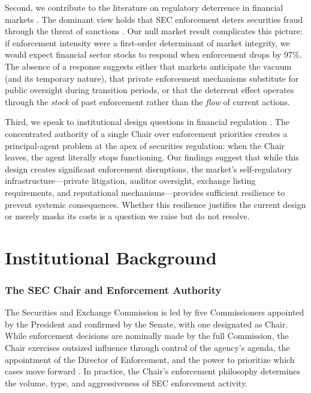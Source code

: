 \documentclass[12pt]{article}
\begin{document}
Second, we contribute to the literature on regulatory deterrence in financial markets \citep{kedia2006economics, dyck2010who, karpoff2017proximate}. The dominant view holds that SEC enforcement deters securities fraud through the threat of sanctions \citep{jackson2007policing}. Our null market result complicates this picture: if enforcement intensity were a first-order determinant of market integrity, we would expect financial sector stocks to respond when enforcement drops by 97\%. The absence of a response suggests either that markets anticipate the vacuum (and its temporary nature), that private enforcement mechanisms substitute for public oversight during transition periods, or that the deterrent effect operates through the \emph{stock} of past enforcement rather than the \emph{flow} of current actions.

Third, we speak to institutional design questions in financial regulation \citep{romano2014regulating}. The concentrated authority of a single Chair over enforcement priorities creates a principal-agent problem at the apex of securities regulation: when the Chair leaves, the agent literally stops functioning. Our findings suggest that while this design creates significant enforcement disruptions, the market's self-regulatory infrastructure---private litigation, auditor oversight, exchange listing requirements, and reputational mechanisms---provides sufficient resilience to prevent systemic consequences. Whether this resilience justifies the current design or merely masks its costs is a question we raise but do not resolve.

\section{Institutional Background}

\subsubsection*{The SEC Chair and Enforcement Authority} The Securities and Exchange Commission is led by five Commissioners appointed by the President and confirmed by the Senate, with one designated as Chair. While enforcement decisions are nominally made by the full Commission, the Chair exercises outsized influence through control of the agency's agenda, the appointment of the Director of Enforcement, and the power to prioritize which cases move forward \citep{romano2014regulating}. In practice, the Chair's enforcement philosophy determines the volume, type, and aggressiveness of SEC enforcement activity.
\end{document}
